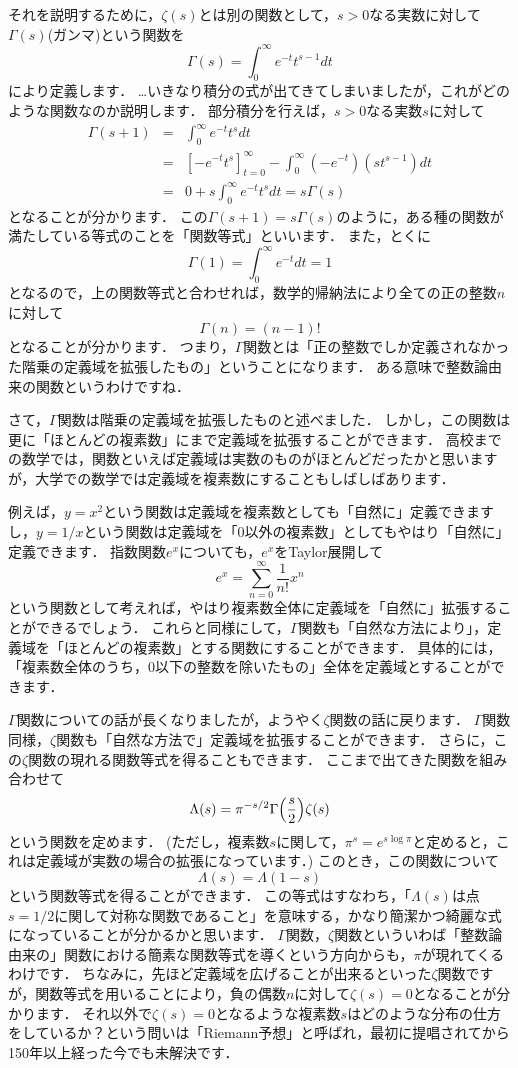 それを説明するために，$\zeta(s)$とは別の関数として，$s>0$なる実数に対して$\Gamma (s)$(ガンマ)という関数を
\[
	\Gamma (s) = \int_{0}^{\infty} e^{-t}t^{s-1}dt
\]
により定義します．
…いきなり積分の式が出てきてしまいましたが，これがどのような関数なのか説明します．
部分積分を行えば，$s>0$なる実数$s$に対して
\begin{eqnarray*}
	\Gamma(s+1) &=& \int_{0}^{\infty} e^{-t}t^{s}dt \\
	&=& \left[ -e^{-t}t^{s} \right]_{t=0}^{\infty} - \int_{0}^{\infty} (-e^{-t})(st^{s-1})dt \\
	&=& 0+s\int_{0}^{\infty} e^{-t}t^{s}dt =s\Gamma(s)
\end{eqnarray*}
となることが分かります．
この$\Gamma(s+1)=s\Gamma(s)$のように，ある種の関数が満たしている等式のことを「関数等式」といいます．
また，とくに
\[
\Gamma(1)=\int_{0}^{\infty} e^{-t}dt=1
\]
となるので，上の関数等式と合わせれば，数学的帰納法により全ての正の整数$n$に対して
\[
	\Gamma(n)=(n-1)!
\]
となることが分かります．
つまり，$\Gamma$関数とは「正の整数でしか定義されなかった階乗の定義域を拡張したもの」ということになります．
ある意味で整数論由来の関数というわけですね．

さて，$\Gamma$関数は階乗の定義域を拡張したものと述べました．
しかし，この関数は更に「ほとんどの複素数」にまで定義域を拡張することができます．
高校までの数学では，関数といえば定義域は実数のものがほとんどだったかと思いますが，大学での数学では定義域を複素数にすることもしばしばあります．

例えば，$y=x^2$という関数は定義域を複素数としても「自然に」定義できますし，$y=1/x$という関数は定義域を「$0$以外の複素数」としてもやはり「自然に」定義できます．
指数関数$e^x$についても，$e^x$をTaylor展開して
\[
	e^x = \sum_{n=0}^{\infty} \frac{1}{n!}x^{n}
\]
という関数として考えれば，やはり複素数全体に定義域を「自然に」拡張することができるでしょう．
これらと同様にして，$\Gamma$関数も「自然な方法により」，定義域を「ほとんどの複素数」とする関数にすることができます．
具体的には，「複素数全体のうち，$0$以下の整数を除いたもの」全体を定義域とすることができます．

$\Gamma$関数についての話が長くなりましたが，ようやく$\zeta$関数の話に戻ります．
$\Gamma$関数同様，$\zeta$関数も「自然な方法で」定義域を拡張することができます．
さらに，この$\zeta$関数の現れる関数等式を得ることもできます．
ここまで出てきた関数を組み合わせて
\[
\Lambda (s)=\pi ^{-s/2} \Gamma\Bigl(\frac{s}{2}\Bigr) \zeta (s)
\]
という関数を定めます．
(ただし，複素数$s$に関して，$\pi ^s = e^{s \log \pi }$と定めると，これは定義域が実数の場合の拡張になっています．)
このとき，この関数について
\[
\Lambda (s)=\Lambda(1-s)
\]
という関数等式を得ることができます．
この等式はすなわち，「$\Lambda (s)$は点$s=1/2$に関して対称な関数であること」を意味する，かなり簡潔かつ綺麗な式になっていることが分かるかと思います．
$\Gamma$関数，$\zeta$関数といういわば「整数論由来の」関数における簡素な関数等式を導くという方向からも，$\pi$が現れてくるわけです．
ちなみに，先ほど定義域を広げることが出来るといった$\zeta$関数ですが，関数等式を用いることにより，負の偶数$n$に対して$\zeta (s)=0$となることが分かります．
それ以外で$\zeta (s)=0$となるような複素数$s$はどのような分布の仕方をしているか？という問いは「Riemann予想」と呼ばれ，最初に提唱されてから150年以上経った今でも未解決です．

